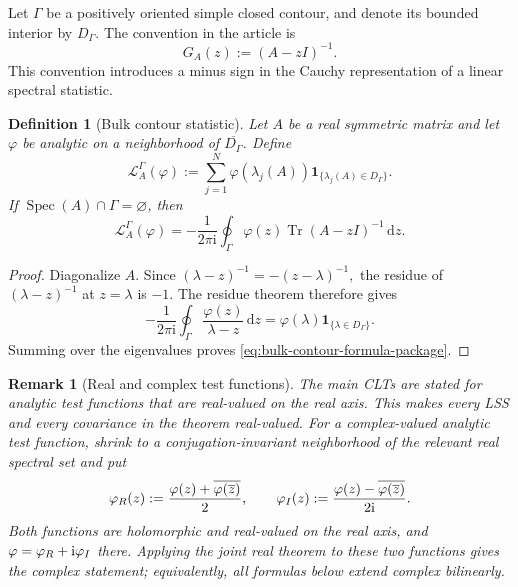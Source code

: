 \documentclass[10pt,a4paper]{amsart}
\newtheorem{definition}[theorem]{Definition}
\newtheorem{remark}[theorem]{Remark}
\newcommand{\Tr}{\operatorname{Tr}}
\newcommand{\spec}{\operatorname{Spec}}
\newcommand{\ii}{\mathrm i}
\newcommand{\dd}{\mathrm d}
\newcommand{\one}{\mathbf 1}
\begin{document}
Let \(\Gamma\) be a positively oriented simple closed contour, and denote its
bounded interior by \(D_\Gamma\).  The convention in the article is
\begin{equation}\label{eq:resolvent-convention-package}
 G_A(z):=(A-zI)^{-1}.
\end{equation}
This convention introduces a minus sign in the Cauchy representation of a
linear spectral statistic.

\begin{definition}[Bulk contour statistic]\label{def:bulk-stat-package}
Let \(A\) be a real symmetric matrix and let \(\varphi\) be analytic on a
neighborhood of \(\overline{D_\Gamma}\).  Define
\begin{equation}\label{eq:bulk-stat-package}
 \mathcal L_A^\Gamma(\varphi)
 :=\sum_{j=1}^N
 \varphi(\lambda_j(A))\one_{\{\lambda_j(A)\in D_\Gamma\}}.
\end{equation}
If \(\spec(A)\cap\Gamma=\varnothing\), then
\begin{equation}\label{eq:bulk-contour-formula-package}
 \mathcal L_A^\Gamma(\varphi)
 =-\frac{1}{2\pi\ii}
 \oint_\Gamma
 \varphi(z)\Tr(A-zI)^{-1}\,\dd z.
\end{equation}
\end{definition}

\begin{proof}
Diagonalize \(A\).  Since
\(
 (\lambda-z)^{-1}=-(z-\lambda)^{-1},
\)
the residue of \((\lambda-z)^{-1}\) at \(z=\lambda\) is \(-1\).
The residue theorem therefore gives
\[
 -\frac{1}{2\pi\ii}\oint_\Gamma
 \frac{\varphi(z)}{\lambda-z}\,\dd z
 =\varphi(\lambda)\one_{\{\lambda\in D_\Gamma\}}.
\]
Summing over the eigenvalues proves \eqref{eq:bulk-contour-formula-package}.
\end{proof}


\begin{remark}[Real and complex test functions]
The main CLTs are stated for analytic test functions that are real-valued on
the real axis.  This makes every LSS and every covariance in the theorem
real-valued.  For a complex-valued analytic test function, shrink to a
conjugation-invariant neighborhood of the relevant real spectral set and put
\[
 \varphi_{\rm R}(z):=\frac{\varphi(z)+\overline{\varphi(\overline z)}}2,
 \qquad
 \varphi_{\rm I}(z):=\frac{\varphi(z)-\overline{\varphi(\overline z)}}{2\ii}.
\]
Both functions are holomorphic and real-valued on the real axis, and
\(\varphi=\varphi_{\rm R}+\ii\varphi_{\rm I}\) there.  Applying the joint real
theorem to these two functions gives the complex statement; equivalently, all
formulas below extend complex bilinearly.
\end{remark}
\end{document}
